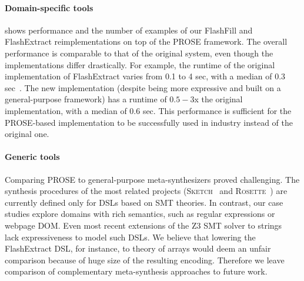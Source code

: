 \paragraph{Domain-specific tools}
 shows performance and the number of examples of our FlashFill and FlashExtract
reimplementations on top of the PROSE framework.
The overall performance is comparable to that of the original system, even though the implementations differ
drastically.
For example, the runtime of the original implementation of FlashExtract varies from 0.1 to 4 sec, with a median of 0.3
sec~\cite{flashextract}.
The new implementation (despite being more expressive and built on a general-purpose framework) has a runtime of
$0.5-3$x the original implementation, with a median of 0.6 sec.
This performance is sufficient for the PROSE-based implementation to be successfully used in industry instead of the
original one.


\paragraph{Generic tools}
Comparing PROSE to general-purpose meta\hyp{}synthesizers proved challenging.
The synthesis procedures of the most related projects (\textsc{Sketch}~\cite{sketch} and
\textsc{Rosette}~\cite{rosette}) are currently defined only for DSLs based on SMT theories.
In contrast, our case studies explore domains with rich semantics, such as regular expressions or webpage DOM.
Even most recent extensions of the Z3 SMT solver to strings~\cite{z3str} lack expressiveness to model such DSLs.
We believe that lowering the FlashExtract DSL, for instance, to theory of arrays would deem an unfair comparison because
of huge size of the resulting encoding.
Therefore we leave comparison of complementary meta-synthesis approaches to future work.
